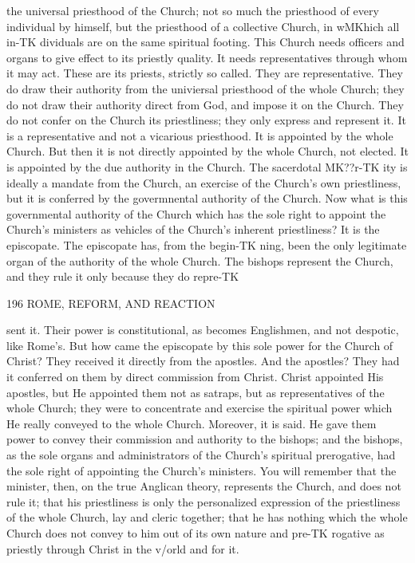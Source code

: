 \documentclass[12pt,a5paper,oneside]{book}
\begin{document}
{the universal priesthood of the Church; not so much 
the priesthood of every individual by himself, but the 
priesthood of a collective Church, in wMKhich all in-TK
dividuals are on the same spiritual footing. This 
Church needs officers and organs to give effect to its 
priestly quality. It needs representatives through 
whom it may act. These are its priests, strictly so 
called. They are representative. They do draw 
their authority from the univiersal priesthood of the 
whole Church; they do not draw their authority 
direct from God, and impose it on the Church. They 
do not confer on the Church its priestliness; they 
only express and represent it. It is a representative 
and not a vicarious priesthood. It is appointed by the 
whole Church. But then it is not directly appointed 
by the whole Church, not elected. It is appointed by 
the due authority in the Church. The sacerdotal MK??r-TK
ity is ideally a mandate from the Church, an exercise 
of the Church's own priestliness, but it is conferred by 
the govermnental authority of the Church. Now what 
is this governmental authority of the Church which 
has the sole right to appoint the Church's ministers as 
vehicles of the Church's inherent priestliness? It is 
the episcopate. The episcopate has, from the begin-TK
ning, been the only legitimate organ of the authority 
of the whole Church. The bishops represent the 
Church, and they rule it only because they do repre-TK



196 ROME, REFORM, AND REACTION 

sent it. Their power is constitutional, as becomes 
Englishmen, and not despotic, like Rome's. But how 
came the episcopate by this sole power for the Church 
of Christ? They received it directly from the apostles. 
And the apostles? They had it conferred on them 
by direct commission from Christ. Christ appointed 
His apostles, but He appointed them not as satraps, 
but as representatives of the whole Church; they 
were to concentrate and exercise the spiritual power 
which He really conveyed to the whole Church. 
Moreover, it is said. He gave them power to convey 
their commission and authority to the bishops; and 
the bishops, as the sole organs and administrators of 
the Church's spiritual prerogative, had the sole right 
of appointing the Church's ministers. You will 
remember that the minister, then, on the true Anglican 
theory, represents the Church, and does not rule it; 
that his priestliness is only the personalized expression 
of the priestliness of the whole Church, lay and cleric 
together; that he has nothing which the whole Church 
does not convey to him out of its own nature and pre-TK
rogative as priestly through Christ in the v/orld and 
for it. 

}
\end{document}
